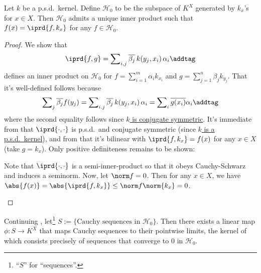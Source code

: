 	\begin{lem}\label{LEM: space H_0}
		Let $k$ be a p.s.d.\ kernel. Define $\mathscr H_0$ to be the subspace of $K^X$ generated by $k_x$'s for $x\in X$. Then $\mathscr H_0$ admits a unique inner product such that $f(x) = \iprd{f, k_x}$ for any $f\in\mathscr H_0$.
	\end{lem}
	
	\begin{proof}
		We show that
		\[
		\iprd{f, g}
		= \sum\nolimits_{i, j} \overline{\beta_j}\, k(y_j, x_i)\,\alpha_i\addtag\label{EQN: inner prod on H_0}
		\]
		defines an inner product on $\mathscr H_0$ for $f = \sum_{i = 1}^m\alpha_i k_{x_i}$ and $g = \sum_{j = 1}^n \beta_j k_{y_j}$. That it's well-defined follows because
		\[
		\sum\nolimits_j \overline{\beta_j} f(y_j)
		= \sum\nolimits_{i. j} \overline{\beta_j}\, k(y_j, x_i)\,\alpha_i
		= \sum\nolimits_i \overline{g(x_i)} \alpha_i\addtag\label{EQN: inner prod on H_0 well-def}
		\]
		where the second equality follows since \uline{$k$ is conjugate symmetric}.
		It's immediate from  that $\iprd{\cdot, \cdot}$ is p.s.d.\ and conjugate symmetric (since \uline{$k$ is a p.s.d.\ kernel}), and from  that it's bilinear with $\iprd{f, k_x} = f(x)$ for any $x\in X$ (take $g = k_x$). Only positive definiteness remains to be shown:
		\begin{subproof}
			Note that $\iprd{\cdot, \cdot}$ is a semi-inner-product so that it obeys Cauchy-Schwarz and induces a seminorm. Now, let $\norm f = 0$. Then for any $x\in X$, we have $\abs{f(x)} = \abs{\iprd{f, k_x}} \le \norm f\norm{k_x} = 0$.\qedhere
		\end{subproof}
	\end{proof}
	
	
	\begin{lem}
		Continuing , let\footnote{
			``$S$'' for ``sequences''.
		} $S := \{\text{Cauchy sequences in $\mathscr H_0$}\}$. Then there exists a linear map $\phi\colon S\to K^X$ that maps Cauchy sequences to their pointwise limits, the kernel of which consists precisely of sequences that converge to $0$ in $\mathscr H_0$.
	\end{lem}
	
